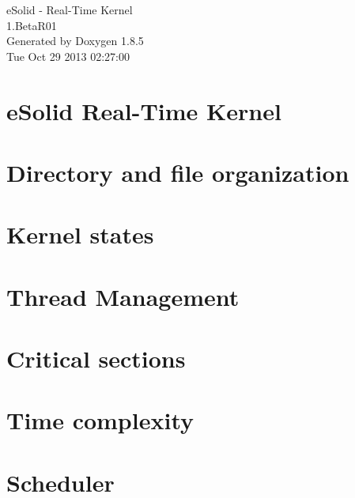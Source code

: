 \documentclass[twoside]{article}
\begin{document}
\hypersetup{pageanchor=false}
\begin{titlepage}
\vspace*{7cm}
\begin{center}%
{\Large e\-Solid -\/ Real-\/\-Time Kernel \\[1ex]\large 1.\-Beta\-R01 }\\
\vspace*{1cm}
{\large Generated by Doxygen 1.8.5}\\
\vspace*{0.5cm}
{\small Tue Oct 29 2013 02:27:00}\\
\end{center}
\end{titlepage}
\tableofcontents
{}
\hypersetup{pageanchor=true}

\section{e\-Solid Real-\/\-Time Kernel}
\label{index}\hypertarget{index}{}
\section{Directory and file organization}
\label{files_org}
\hypertarget{files_org}{}

\section{Kernel states}
\label{states}
\hypertarget{states}{}

\section{Thread Management}
\label{threads}
\hypertarget{threads}{}

\section{Critical sections}
\label{critical_section}
\hypertarget{critical_section}{}

\section{Time complexity}
\label{time_complexity}
\hypertarget{time_complexity}{}

\section{Scheduler}
\label{scheduler}
\hypertarget{scheduler}{}

\end{document}
